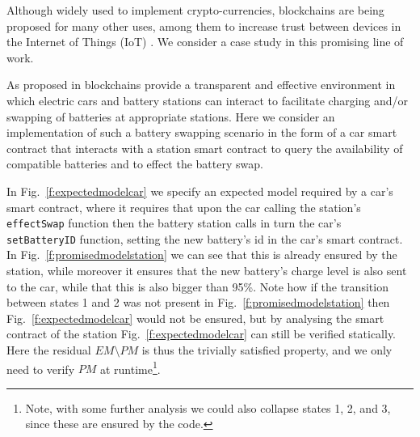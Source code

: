 
Although widely used to implement crypto-currencies, blockchains are being proposed for many other uses, among them to increase trust between devices in the Internet of Things (IoT) \cite{joshua}. We consider a case study in this promising line of work.

As proposed in \cite{electricbattery} blockchains provide a transparent and effective environment in which electric cars and battery stations can interact to facilitate charging and/or swapping of batteries at appropriate stations. Here we consider an implementation of such a battery swapping scenario in the form of a car smart contract that interacts with a station smart contract to query the availability of compatible batteries and to effect the battery swap.

In Fig.~\ref{f:expectedmodelcar} we specify an expected model required by a car's smart contract, where it requires that upon the car calling the station's \texttt{effectSwap} function then the battery station calls in turn the car's \texttt{setBatteryID} function, setting the new battery's id in the car's smart contract. In Fig.~\ref{f:promisedmodelstation} we can see that this is already ensured by the station, while moreover it ensures that the new battery's charge level is also sent to the car, while that this is also bigger than 95\%. Note how if the transition between states 1 and 2 was not present in Fig.~\ref{f:promisedmodelstation} then Fig.~\ref{f:expectedmodelcar} would not be ensured, but by analysing the smart contract of the station Fig.~\ref{f:expectedmodelcar} can still be verified statically. Here the residual $EM \setminus PM$ is thus the trivially satisfied property, and we only need to verify $PM$ at runtime\footnote{Note, with some further analysis we could also collapse states 1, 2, and 3, since these are ensured by the code.}.



